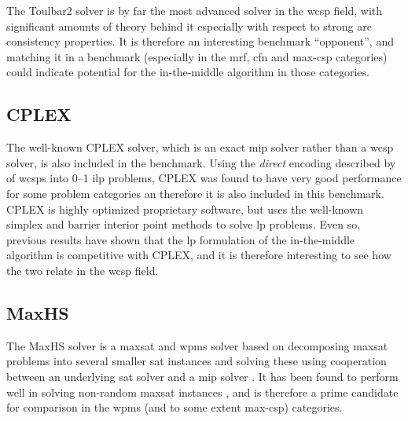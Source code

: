 The Toulbar2 solver is by far the most advanced solver in the \gls{wcsp} field, with significant amounts of theory behind it especially with respect to strong arc consistency properties.
It is therefore an interesting benchmark \enquote{opponent}, and matching it in a benchmark (especially in the \gls{mrf}, \gls{cfn} and max-\gls{csp} categories) could indicate potential for the in-the-middle algorithm in those categories.

\subsection{CPLEX}
The well-known CPLEX solver, which is an exact \gls{mip} solver rather than a \gls{wcsp} solver, is also included in the benchmark.
Using the \emph{direct} encoding described by \textcite{deGivry14} of \glspl{wcsp} into 0--1 \gls{ilp} problems, CPLEX was found to have very good performance for some problem categories an therefore it is also included in this benchmark.
CPLEX is highly optimized proprietary software, but uses the well-known simplex and barrier interior point methods to solve \gls{lp} problems.
Even so, previous results \parencite{Mason01,Ernst05} have shown that the \gls{lp} formulation of the in-the-middle algorithm is competitive with CPLEX, and it is therefore interesting to see how the two relate in the \gls{wcsp} field.

\subsection{MaxHS}
The MaxHS solver is a \gls{maxsat} and \gls{wpms} solver based on decomposing \gls{maxsat} problems into several smaller \gls{sat} instances and solving these using cooperation between an underlying \gls{sat} solver and a \gls{mip} solver \parencite{Davies11}.
It has been found to perform well in solving non-random \gls{maxsat} instances \parencite{Davies13}, and is therefore a prime candidate for comparison in the \gls{wpms} (and to some extent max-\gls{csp}) categories.
